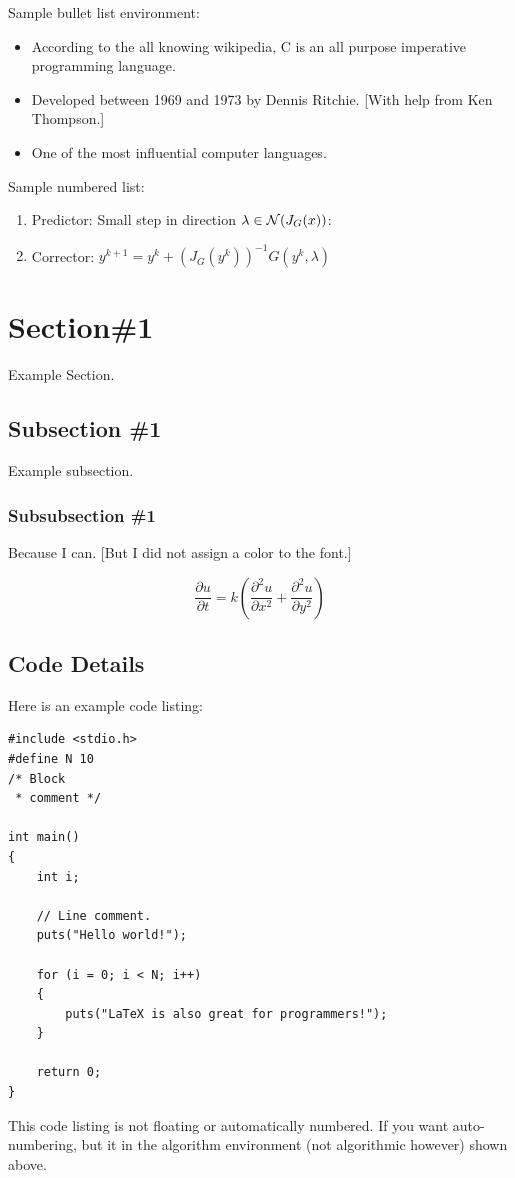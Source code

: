 Sample bullet list environment:
\begin{itemize}
\item According to the all knowing wikipedia, C is an all purpose imperative programming language.   
\item Developed between 1969 and 1973 by Dennis Ritchie.  [With help from Ken Thompson.]
\item One of the most influential computer languages.
\end{itemize}

Sample numbered list:
 \begin{enumerate}
 \item Predictor:  Small step in direction $\lambda \in {\cal N}(J_G(x))$:
\item Corrector:  $y^{k+1} = y^k + (J_G(y^k))^{-1}G(y^k,\lambda)$
\end{enumerate}

\section{Section\#1 }

Example Section.

\subsection{Subsection \#1}

Example subsection.

\subsubsection{Subsubsection \#1}

Because I can.   [But I did not assign a color to the font.]


\begin{equation}
\displaystyle\frac{\partial u}{\partial t} = k \left( \frac{\partial^2 u}{\partial x^2} +  \frac{\partial^2 u}{\partial y^2} \right)
\end{equation}

\subsection{Code Details}
Here is an example code listing:
\begin{lstlisting}
#include <stdio.h>
#define N 10
/* Block
 * comment */
 
int main()
{
    int i;
 
    // Line comment.
    puts("Hello world!");
 
    for (i = 0; i < N; i++)
    {
        puts("LaTeX is also great for programmers!");
    }
 
    return 0;
}
\end{lstlisting}
This code listing is not floating or automatically numbered.  If you want auto-numbering, but it in the algorithm environment (not algorithmic however) shown above.


